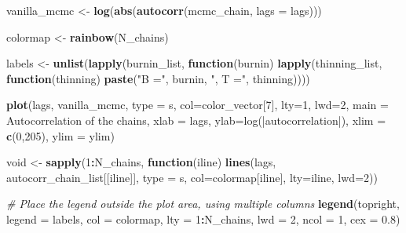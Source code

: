 \documentclass[
]{article}
\newenvironment{Shaded}{\begin{snugshade}}{\end{snugshade}}
\newcommand{\AttributeTok}[1]{\textcolor[rgb]{0.13,0.29,0.53}{#1}}
\newcommand{\CommentTok}[1]{\textcolor[rgb]{0.56,0.35,0.01}{\textit{#1}}}
\newcommand{\ControlFlowTok}[1]{\textcolor[rgb]{0.13,0.29,0.53}{\textbf{#1}}}
\newcommand{\DecValTok}[1]{\textcolor[rgb]{0.00,0.00,0.81}{#1}}
\newcommand{\FloatTok}[1]{\textcolor[rgb]{0.00,0.00,0.81}{#1}}
\newcommand{\FunctionTok}[1]{\textcolor[rgb]{0.13,0.29,0.53}{\textbf{#1}}}
\newcommand{\NormalTok}[1]{#1}
\newcommand{\OtherTok}[1]{\textcolor[rgb]{0.56,0.35,0.01}{#1}}
\newcommand{\SpecialCharTok}[1]{\textcolor[rgb]{0.81,0.36,0.00}{\textbf{#1}}}
\newcommand{\StringTok}[1]{\textcolor[rgb]{0.31,0.60,0.02}{#1}}
\begin{document}
\begin{Shaded}
\begin{Highlighting}[]
\NormalTok{vanilla\_mcmc }\OtherTok{\textless{}{-}} \FunctionTok{log}\NormalTok{(}\FunctionTok{abs}\NormalTok{(}\FunctionTok{autocorr}\NormalTok{(mcmc\_chain, }\AttributeTok{lags =}\NormalTok{ lags)))}

\NormalTok{colormap }\OtherTok{\textless{}{-}} \FunctionTok{rainbow}\NormalTok{(N\_chains)}

\NormalTok{labels }\OtherTok{\textless{}{-}} \FunctionTok{unlist}\NormalTok{(}\FunctionTok{lapply}\NormalTok{(burnin\_list, }\ControlFlowTok{function}\NormalTok{(burnin) }
                 \FunctionTok{lapply}\NormalTok{(thinning\_list, }\ControlFlowTok{function}\NormalTok{(thinning) }
                 \FunctionTok{paste}\NormalTok{(}\StringTok{"B ="}\NormalTok{, burnin, }\StringTok{", T ="}\NormalTok{, thinning))))}

\FunctionTok{plot}\NormalTok{(lags, vanilla\_mcmc, }\AttributeTok{type =} \StringTok{\textquotesingle{}s\textquotesingle{}}\NormalTok{, }\AttributeTok{col=}\NormalTok{color\_vector[}\DecValTok{7}\NormalTok{], }\AttributeTok{lty=}\DecValTok{1}\NormalTok{, }\AttributeTok{lwd=}\DecValTok{2}\NormalTok{, }\AttributeTok{main =} \StringTok{\textquotesingle{}Autocorrelation of the chains\textquotesingle{}}\NormalTok{, }\AttributeTok{xlab =} \StringTok{\textquotesingle{}lags\textquotesingle{}}\NormalTok{, }\AttributeTok{ylab=}\StringTok{\textquotesingle{}log(|autocorrelation|)\textquotesingle{}}\NormalTok{, }\AttributeTok{xlim =} \FunctionTok{c}\NormalTok{(}\DecValTok{0}\NormalTok{,}\DecValTok{205}\NormalTok{), }\AttributeTok{ylim =}\NormalTok{ ylim)}

\NormalTok{void }\OtherTok{\textless{}{-}} \FunctionTok{sapply}\NormalTok{(}\DecValTok{1}\SpecialCharTok{:}\NormalTok{N\_chains, }\ControlFlowTok{function}\NormalTok{(iline) }\FunctionTok{lines}\NormalTok{(lags, autocorr\_chain\_list[[iline]], }\AttributeTok{type =} \StringTok{\textquotesingle{}s\textquotesingle{}}\NormalTok{, }\AttributeTok{col=}\NormalTok{colormap[iline], }\AttributeTok{lty=}\NormalTok{iline, }\AttributeTok{lwd=}\DecValTok{2}\NormalTok{))}

\CommentTok{\# Place the legend outside the plot area, using multiple columns}
\FunctionTok{legend}\NormalTok{(}\StringTok{\textquotesingle{}topright\textquotesingle{}}\NormalTok{, }\AttributeTok{legend =}\NormalTok{ labels, }\AttributeTok{col =}\NormalTok{ colormap, }\AttributeTok{lty =} \DecValTok{1}\SpecialCharTok{:}\NormalTok{N\_chains, }\AttributeTok{lwd =} \DecValTok{2}\NormalTok{, }\AttributeTok{ncol =} \DecValTok{1}\NormalTok{, }\AttributeTok{cex =} \FloatTok{0.8}\NormalTok{)}
\end{Highlighting}
\end{Shaded}
\end{document}
